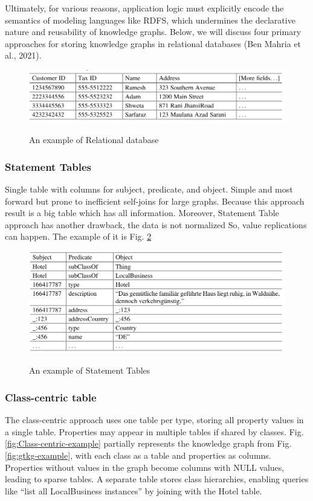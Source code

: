 \documentclass[12pt]{article}
\begin{document}
Ultimately, for various reasons, application logic must explicitly encode the semantics of modeling languages like RDFS, which undermines the declarative nature and reusability of knowledge graphs. Below, we will discuss four primary approaches for storing knowledge graphs in relational databases (Ben Mahria et al., 2021).

\begin{figure}
    \includegraphics[width=\linewidth]{imgs/rd-example.jpeg}
    \label{fig:rd-example}
    \caption{An example of Relational database}
\end{figure}

\subsubsection{Statement Tables}
Single table with columns for subject, predicate, and object. Simple and most forward but
prone to inefficient self-joins for large graphs. Because this approach result is a big table
which has all information. Moreover, Statement Table approach has another drawback,
the data is not normalized So, value replications can happen. The example of it is Fig. \ref{fig:Statement-Tables-example}

\begin{figure}
    \includegraphics[width=\linewidth]{imgs/Statement table.jpeg}
    \label{fig:Statement-Tables-example}
    \caption{An example of Statement Tables }
\end{figure}

\subsubsection{Class-centric table}
The class-centric approach uses one table per type, storing all property values in a single table. Properties may appear in multiple tables if shared by classes. Fig. \ref{fig:Class-centric-example} partially represents the knowledge graph from Fig. \ref{fig:gtkg-example}, with each class as a table and properties as columns. Properties without values in the graph become columns with NULL values, leading to sparse tables. A separate table stores class hierarchies, enabling queries like “list all LocalBusiness instances” by joining with the Hotel table.
\end{document}
